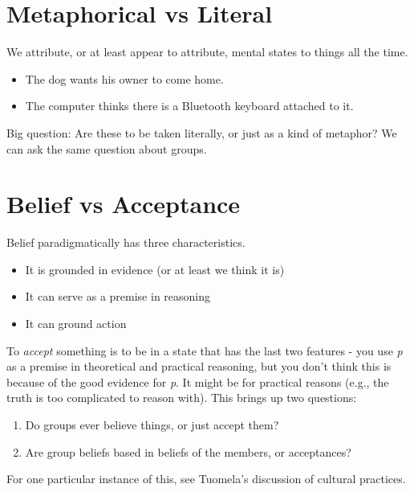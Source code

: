 
\def\mytitle{Group Belief, Background Notes}
\def\myauthor{Brian Weatherson}
\def\mydate{March 15, 2018}


\footnotesize

\section{Metaphorical vs Literal}
\label{metaphoricalvsliteral}

We attribute, or at least appear to attribute, mental states to things all the time.

\begin{itemize}
\item{} The dog wants his owner to come home.

\item{} The computer thinks there is a Bluetooth keyboard attached to it.

\end{itemize}
Big question: Are these to be taken literally, or just as a kind of metaphor? We can ask the same question about groups.

\section{Belief vs Acceptance}
\label{beliefvsacceptance}

Belief paradigmatically has three characteristics.

\begin{itemize}
\item{} It is grounded in evidence (or at least we think it is)

\item{} It can serve as a premise in reasoning

\item{} It can ground action

\end{itemize}
To \emph{accept} something is to be in a state that has the last two features - you use \emph{p} as a premise in theoretical and practical reasoning, but you don't think this is because of the good evidence for \emph{p}. It might be for practical reasons (e.g., the truth is too complicated to reason with). This brings up two questions:

\begin{enumerate}
\item{} Do groups ever believe things, or just accept them?

\item{} Are group beliefs based in beliefs of the members, or acceptances?

\end{enumerate}
For one particular instance of this, see Tuomela's discussion of cultural practices.

